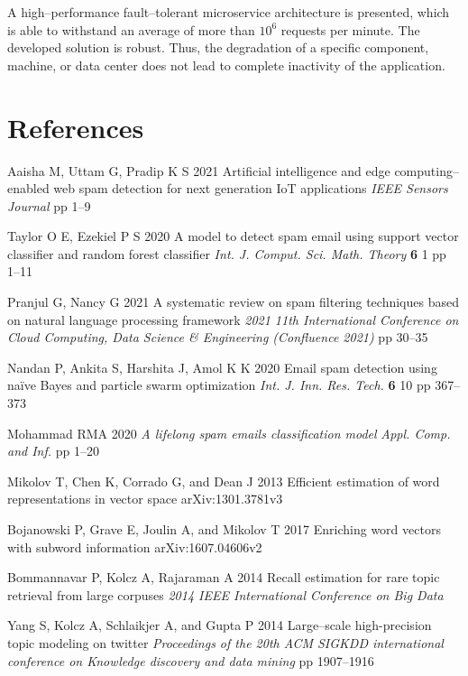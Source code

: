 \documentclass[12pt]{jpconf}
\begin{document}
A high--performance fault--tolerant microservice architecture is presented, which is able to withstand an average of more than $10^6$ requests per minute. The developed solution is robust. Thus, the degradation of a specific component, machine, or data center does not lead to complete inactivity of the application.

\section*{References}
\begin{thebibliography}{99}
Aaisha M, Uttam G, Pradip K S
2021 {Artificial intelligence and edge computing--enabled
	web spam detection for next generation IoT
	applications} {\it IEEE Sensors Journal} {\bf } pp 1--9

Taylor O E, Ezekiel P S
2020 {A model to detect spam email using support vector classifier and random forest classifier} 
\emph{Int. J. Comput. Sci. Math. Theory} {\bf 6} 1 pp 1--11

Pranjul G, Nancy G
2021 {A systematic review on spam filtering techniques based on
natural language processing framework} \emph{2021 11th International Conference on Cloud Computing, Data Science \& Engineering (Confluence 2021)} pp 30--35

Nandan P, Ankita S, Harshita J, Amol K K
2020 {Email spam detection using naïve Bayes and particle swarm optimization} \emph{Int. J. Inn. Res. Tech.} {\bf 6} 10 pp 367--373

Mohammad RMA
2020 \emph{A lifelong spam emails classification model}
\emph{Appl. Comp. and Inf.} pp 1--20

Mikolov T, Chen K, Corrado G, and Dean J
2013 {Efficient estimation of word representations in vector space} 
arXiv:1301.3781v3

Bojanowski P, Grave E, Joulin A, and Mikolov T
2017 {Enriching word vectors with subword information} 
arXiv:1607.04606v2

Bommannavar P, Kolcz A, Rajaraman A
2014 {Recall estimation for rare topic retrieval from large corpuses}
\emph{2014 IEEE International Conference on Big Data}

Yang S, Kolcz A, Schlaikjer A, and Gupta P
2014 {Large--scale high-precision topic modeling on twitter} 
\emph{Proceedings of the 20th ACM SIGKDD international conference on Knowledge discovery and data mining} pp 1907--1916

\end{thebibliography}
\end{document}
